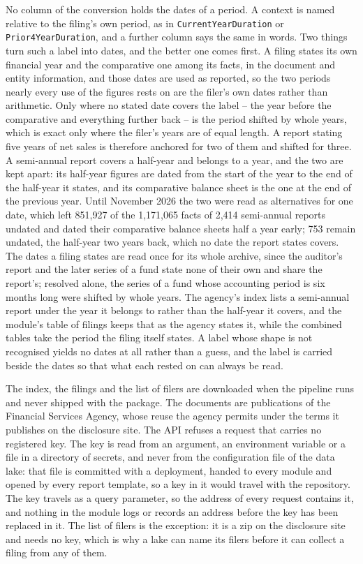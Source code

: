 No column of the conversion holds the dates of a period. A context is named relative to the filing's own period, as in \verb|CurrentYearDuration| or \verb|Prior4YearDuration|, and a further column says the same in words. Two things turn such a label into dates, and the better one comes first. A filing states its own financial year and the comparative one among its facts, in the document and entity information, and those dates are used as reported, so the two periods nearly every use of the figures rests on are the filer's own dates rather than arithmetic. Only where no stated date covers the label -- the year before the comparative and everything further back -- is the period shifted by whole years, which is exact only where the filer's years are of equal length. A report stating five years of net sales is therefore anchored for two of them and shifted for three. A semi-annual report covers a half-year and belongs to a year, and the two are kept apart: its half-year figures are dated from the start of the year to the end of the half-year it states, and its comparative balance sheet is the one at the end of the previous year. Until November 2026 the two were read as alternatives for one date, which left 851,927 of the 1,171,065 facts of 2,414 semi-annual reports undated and dated their comparative balance sheets half a year early; 753 remain undated, the half-year two years back, which no date the report states covers. The dates a filing states are read once for its whole archive, since the auditor's report and the later series of a fund state none of their own and share the report's; resolved alone, the series of a fund whose accounting period is six months long were shifted by whole years. The agency's index lists a semi-annual report under the year it belongs to rather than the half-year it covers, and the module's table of filings keeps that as the agency states it, while the combined tables take the period the filing itself states. A label whose shape is not recognised yields no dates at all rather than a guess, and the label is carried beside the dates so that what each rested on can always be read.

The index, the filings and the list of filers are downloaded when the pipeline runs and never shipped with the package. The documents are publications of the Financial Services Agency, whose reuse the agency permits under the terms it publishes on the disclosure site. The API refuses a request that carries no registered key. The key is read from an argument, an environment variable or a file in a directory of secrets, and never from the configuration file of the data lake: that file is committed with a deployment, handed to every module and opened by every report template, so a key in it would travel with the repository. The key travels as a query parameter, so the address of every request contains it, and nothing in the module logs or records an address before the key has been replaced in it. The list of filers is the exception: it is a zip on the disclosure site and needs no key, which is why a lake can name its filers before it can collect a filing from any of them.

